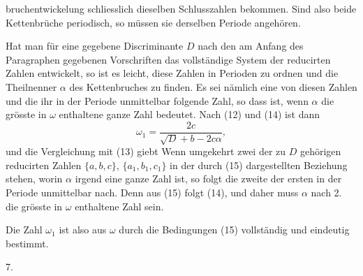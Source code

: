 bruchentwickelung schliesslich dieselben Schlusszahlen bekommen.
Sind also beide Kettenbrüche periodisch, so müssen sie derselben
Periode angehören.

Hat man für eine gegebene Discriminante $D$ nach den am
Anfang des Paragraphen gegebenen Vorschriften das vollständige
System der reducirten Zahlen entwickelt, so ist es leicht, diese
Zahlen in Perioden zu ordnen und die Theilnenner $\alpha$ des Kettenbruches
 zu finden. Es sei nämlich
eine von diesen Zahlen und
die ihr in der Periode unmittelbar folgende Zahl, so dass
ist, wenn $\alpha$ die grösste in $\omega$ enthaltene ganze Zahl bedeutet.
Nach (12) und (14) ist dann
\[
\omega_1 = \frac{2c}{\sqrt{D}+b-2c\alpha},
\]
und die Vergleichung mit (13) giebt
Wenn umgekehrt zwei der zu $D$ gehörigen reducirten Zahlen
$\{a, b, c\}$, $\{a_1, b_1, c_1\}$ in der durch (15) dargestellten Beziehung
stehen, worin $\alpha$ irgend eine ganze Zahl ist, so folgt die zweite
der ersten in der Periode unmittelbar nach. Denn aus (15)
folgt (14), und daher muss $\alpha$ nach 2. die grösste in $\omega$ enthaltene
Zahl sein.

Die Zahl $\omega_1$ ist also aus $\omega$ durch die Bedingungen (15)
vollständig und eindeutig bestimmt.

7. 
